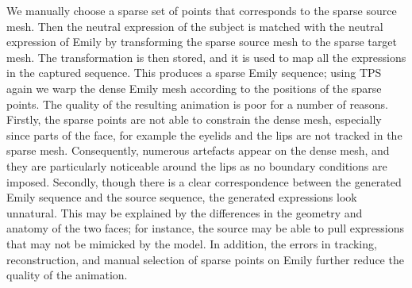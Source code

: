 \documentclass[11pt]{report}
\begin{document}
We manually choose a sparse set of points that corresponds to the sparse source mesh. Then the neutral expression of the subject is matched with the neutral expression of Emily by transforming the sparse source mesh to the sparse target mesh. The transformation is then stored, and it is used to map all the expressions in the captured sequence. This produces a sparse Emily sequence; using TPS again we warp the dense Emily mesh according to the positions of the sparse points. The quality of the resulting animation is poor for a number of reasons. Firstly, the sparse points are not able to constrain the dense mesh, especially since parts of the face, for example the eyelids and the lips are not tracked in the sparse mesh. Consequently, numerous artefacts appear on the dense mesh, and they are particularly noticeable around the lips as no boundary conditions are imposed. Secondly, though there is a clear correspondence between the generated Emily sequence and the source sequence, the generated expressions look unnatural. This may be explained by the differences in the geometry and anatomy of the two faces; for instance, the source may be able to pull expressions that may not be mimicked by the model. In addition, the errors in tracking, reconstruction, and manual selection of sparse points on Emily further reduce the quality of the animation.
\end{document}
